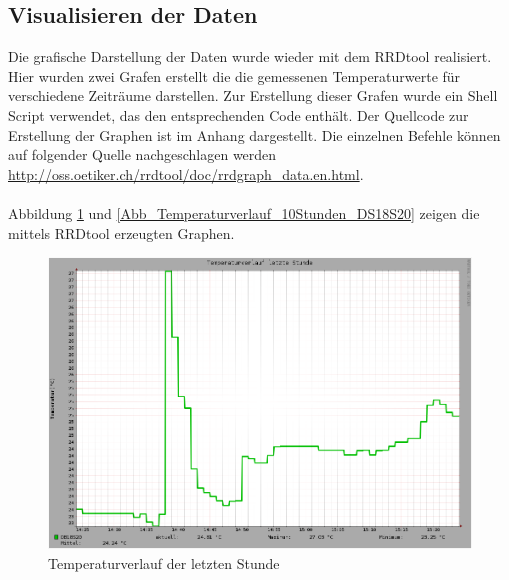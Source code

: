 \subsection{Visualisieren der Daten}
\label{subsection_Visualisieren der Daten DS18S20}
Die grafische Darstellung der Daten wurde wieder mit dem RRDtool realisiert. Hier wurden zwei Grafen erstellt die die gemessenen Temperaturwerte für verschiedene Zeiträume darstellen. Zur Erstellung dieser Grafen wurde ein Shell Script verwendet, das den entsprechenden Code enthält. Der Quellcode zur Erstellung der Graphen ist im Anhang dargestellt. Die einzelnen Befehle können auf folgender Quelle nachgeschlagen werden \url{http://oss.oetiker.ch/rrdtool/doc/rrdgraph_data.en.html}.\\
\\Abbildung \ref{Abb_Temperaturverlauf_Stunde_DS18S20} und \ref{Abb_Temperaturverlauf_10Stunden_DS18S20} zeigen die mittels RRDtool erzeugten Graphen.

\begin{figure}[!h] 
  \centering
     \includegraphics[scale=.28]{BilderAllgemein/TemperaturStunde.png}
  \caption{Temperaturverlauf der letzten Stunde}
  \label{Abb_Temperaturverlauf_Stunde_DS18S20}
\end{figure}

